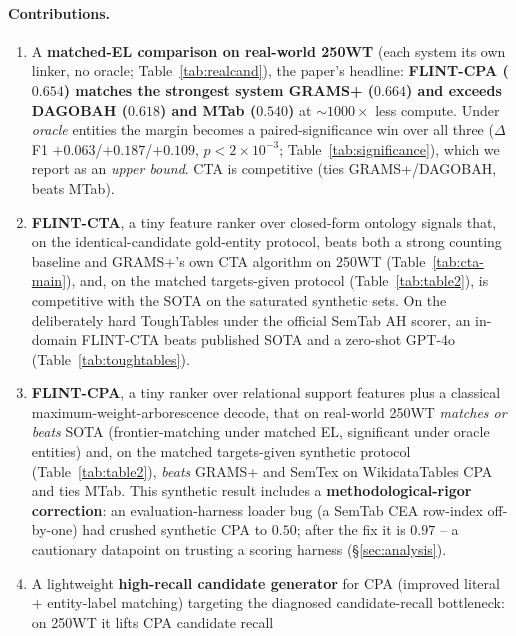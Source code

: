 \documentclass[11pt]{article}
\begin{document}
\paragraph{Contributions.}
\begin{enumerate}
  \item A \textbf{matched-EL comparison on real-world 250WT} (each system its own
        linker, no oracle; Table~\ref{tab:realcand}), the paper's headline:
        \textbf{FLINT-CPA ($0.654$) matches the strongest system GRAMS+ ($0.664$) and
        exceeds DAGOBAH ($0.618$) and MTab ($0.540$)} at $\sim$$1000\times$ less compute.
        Under \emph{oracle} entities the margin becomes a paired-significance win over
        all three ($\Delta$F1 $+0.063$/$+0.187$/$+0.109$, $p<2\times10^{-3}$;
        Table~\ref{tab:significance}), which we report as an \emph{upper bound}. CTA is
        competitive (ties GRAMS+/DAGOBAH, beats MTab).
  \item \textbf{FLINT-CTA}, a tiny feature ranker over closed-form ontology signals
        that, on the identical-candidate gold-entity protocol, beats both a strong
        counting baseline and GRAMS+'s own CTA algorithm on 250WT
        (Table~\ref{tab:cta-main}), and, on the matched targets-given protocol
        (Table~\ref{tab:table2}), is competitive with the SOTA on the saturated
        synthetic sets. On the deliberately hard ToughTables under the official SemTab
        AH scorer, an in-domain FLINT-CTA beats published SOTA and a zero-shot GPT-4o
        (Table~\ref{tab:toughtables}).
  \item \textbf{FLINT-CPA}, a tiny ranker over relational support features plus a
        classical maximum-weight-arborescence decode, that on real-world 250WT
        \emph{matches or beats} SOTA (frontier-matching under matched EL, significant
        under oracle entities) and, on the matched targets-given synthetic protocol
        (Table~\ref{tab:table2}), \emph{beats} GRAMS+ and SemTex on WikidataTables CPA
        and ties MTab. This synthetic result includes a \textbf{methodological-rigor
        correction}: an evaluation-harness loader bug (a SemTab CEA row-index
        off-by-one) had crushed synthetic CPA to $0.50$; after the fix it is $0.97$ --
        a cautionary datapoint on trusting a scoring harness (\S\ref{sec:analysis}).
  \item A lightweight \textbf{high-recall candidate generator} for CPA
        (improved literal $+$ entity-label matching) targeting the diagnosed
        candidate-recall bottleneck: on 250WT it lifts CPA candidate recall
$$
\end{enumerate}
\end{document}
